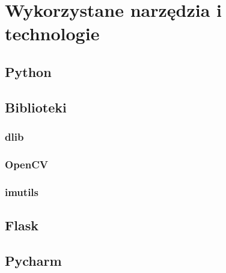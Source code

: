 \chapter{Wykorzystane narzędzia i technologie}
\label{cha:wykorzystaneNarzedziaITechnologie}
\section{Python}
\section{Biblioteki}
\subsection{dlib}
\subsection{OpenCV}
\subsection{imutils}
\section{Flask}
\section{Pycharm}